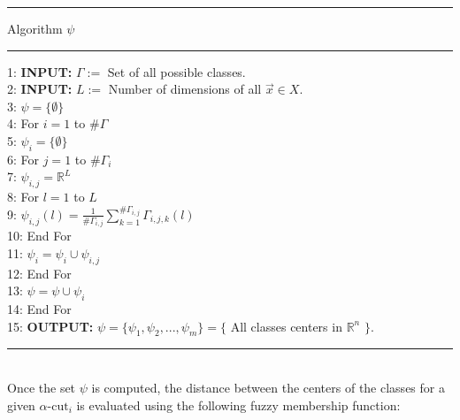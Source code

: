 \documentclass[11pt, oneside]{Thesis} %
\begin{document}
\newpage
\noindent\rule[0.1cm]{\linewidth}{0.3pt}
\begin{center}
  \vspace{-1cm}
  Algorithm $\psi$
  \vspace{-1cm}
\end{center}
\noindent\rule[0.1cm]{\linewidth}{0.3pt}
1: \hspace{0.3cm}\textbf{INPUT:} $\Gamma :=$ Set of all possible classes.\\
2: \hspace{0.3cm}\textbf{INPUT:} $L:=$ Number of dimensions of all $\vec{x} \in X$.\\
3: \hspace{0.7cm}$\psi = \lbrace \emptyset \rbrace$\\
4: \hspace{0.7cm}For $i=1$ to $\#\Gamma$\\
5: \hspace{1.1cm}$\psi_i = \lbrace \emptyset \rbrace$\\
6: \hspace{1.1cm}For $j=1$ to $\#\Gamma_i$\\
7: \hspace{1.55cm}$\psi_{i,j} = \mathbb{R}^L$\\
8: \hspace{1.55cm}For $l=1$ to $L$\\
9: \hspace{1.9cm}$\psi_{i,j}(l) = \frac{1}{\#\Gamma_{i,j}} \sum_{k=1}^{\#\Gamma_{i,j}}
\Gamma_{i,j,k}(l)$\\
10: \hspace{1.4cm}End For\\
11: \hspace{1.4cm}$\psi_i = \psi_i \cup \psi_{i,j}$\\
12: \hspace{1.1cm}End For\\
13: \hspace{1.1cm}$\psi = \psi \cup \psi_i$\\
14: \hspace{0.7cm}End For\\
15: \hspace{0.25cm}\textbf{OUTPUT:} $\psi = \lbrace \psi_1, \psi_2, ..., \psi_m \rbrace = \lbrace$ 
All classes centers in $\mathbb{R}^n$ $\rbrace$.\\
\noindent\rule[0.1cm]{\linewidth}{0.3pt} \\

Once the set $\psi$ is computed, the distance between the centers of the classes for 
a given $\alpha\text{-cut}_i$ is evaluated using the following 
fuzzy membership function:
\end{document}
